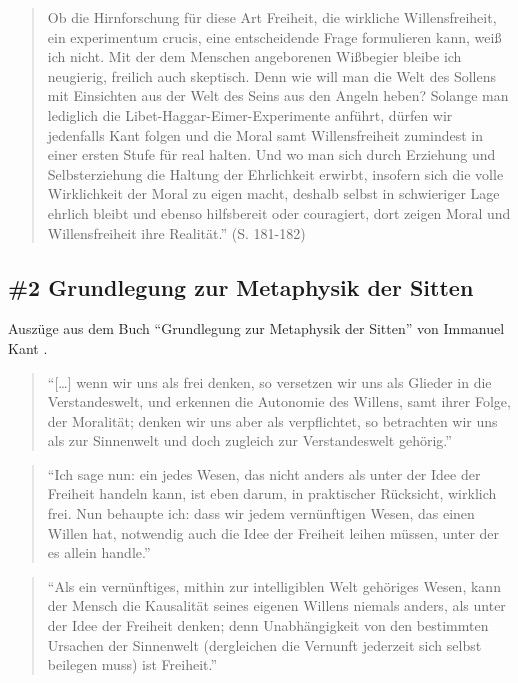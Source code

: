 \documentclass[
  a4paper,
]{report}
\begin{document}
\begin{quote}
Ob die Hirnforschung für diese Art Freiheit, die wirkliche Willensfreiheit, ein experimentum crucis, eine entscheidende Frage formulieren kann, weiß ich nicht. Mit der dem Menschen angeborenen Wißbegier bleibe ich neugierig, freilich auch skeptisch. Denn wie will man die Welt des Sollens mit Einsichten aus der Welt des Seins aus den Angeln heben? Solange man lediglich die Libet-Haggar-Eimer-Experimente anführt, dürfen wir jedenfalls Kant folgen und die Moral samt Willensfreiheit zumindest in einer ersten Stufe für real halten. Und wo man sich durch Erziehung und Selbsterziehung die Haltung der Ehrlichkeit erwirbt, insofern sich die volle Wirklichkeit der Moral zu eigen macht, deshalb selbst in schwieriger Lage ehrlich bleibt und ebenso hilfsbereit oder couragiert, dort zeigen Moral und Willensfreiheit ihre Realität.'' (S. 181-182)
\end{quote}

\hypertarget{pr-expert-ev2}{%
\subsection{\#2 Grundlegung zur Metaphysik der Sitten}\label{pr-expert-ev2}}

Auszüge aus dem Buch ``Grundlegung zur Metaphysik der Sitten'' von Immanuel Kant \citeyearpar{Kant1785}.

\begin{quote}
``{[}\ldots{]} wenn wir uns als frei denken, so versetzen wir uns als Glieder in die Verstandeswelt, und erkennen die Autonomie des Willens, samt ihrer Folge, der Moralität; denken wir uns aber als verpflichtet, so betrachten wir uns als zur Sinnenwelt und doch zugleich zur Verstandeswelt gehörig.''
\end{quote}

\begin{quote}
``Ich sage nun: ein jedes Wesen, das nicht anders als unter der Idee der Freiheit handeln kann, ist eben darum, in praktischer Rücksicht, wirklich frei. Nun behaupte ich: dass wir jedem vernünftigen Wesen, das einen Willen hat, notwendig auch die Idee der Freiheit leihen müssen, unter der es allein handle.''
\end{quote}

\begin{quote}
``Als ein vernünftiges, mithin zur intelligiblen Welt gehöriges Wesen, kann der Mensch die Kausalität seines eigenen Willens niemals anders, als unter der Idee der Freiheit denken; denn Unabhängigkeit von den bestimmten Ursachen der Sinnenwelt (dergleichen die Vernunft jederzeit sich selbst beilegen muss) ist Freiheit.''
\end{quote}
\end{document}
